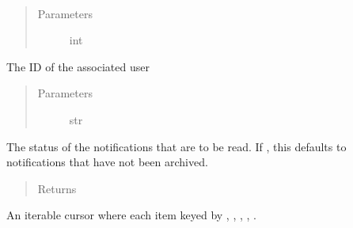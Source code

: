 \documentclass[letterpaper,10pt,english]{sphinxmanual}
\begin{document}

\begin{fulllineitems}
\label{\detokenize{tiger_leagues/models/readme:tiger_leagues.models.user_model.read_notifications}}~\begin{quote}\begin{description}
\item[{Parameters}] \leavevmode
{} \textendash{} int

\end{description}\end{quote}

The ID of the associated user
\begin{quote}\begin{description}
\item[{Parameters}] \leavevmode
{} \textendash{} str

\end{description}\end{quote}

The status of the notifications that are to be read. If , this defaults 
to notifications that have not been archived.
\begin{quote}\begin{description}
\item[{Returns}] \leavevmode
{}

\end{description}\end{quote}

An iterable cursor where each item keyed by , 
, , , .

\end{fulllineitems}

\end{document}
